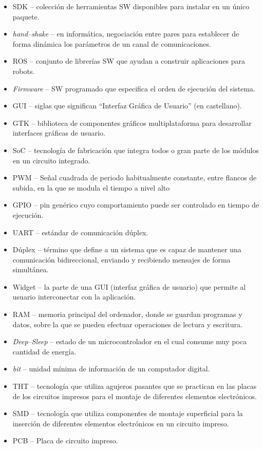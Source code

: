\begin{itemize}
    \item \ac{SDK} -- colección de herramientas \ac{SW} disponibles para instalar en un único paquete.
    \item \textit{hand--shake} -- en informática, negociación entre pares para establecer de forma dinámica los parámetros de un canal de comunicaciones. 
    \item \ac{ROS} -- conjunto de librerías \ac{SW} que ayudan a construir aplicaciones para robots.
    \item \textit{Firmware} -- \ac{SW} programado que especifica el orden de ejecución del sistema.
    \item \ac{GUI} -- siglas que significan ``Interfaz Gráfica de Usuario'' (en castellano).
    \item \ac{GTK} -- biblioteca de componentes gráficos multiplataforma para desarrollar interfaces gráficas de usuario.
    \item \ac{SoC} -- tecnología de fabricación que integra todos o gran parte de los módulos en un circuito integrado. 
    \item \ac{PWM} -- Señal cuadrada de periodo habitualmente constante, entre flancos de subida, en la que se modula el tiempo a nivel alto
    \item \ac{GPIO} -- pin genérico cuyo comportamiento puede ser controlado en tiempo de ejecución.
    \item \ac{UART} -- estándar de comunicación dúplex.
    \item Dúplex -- término que define a un sistema que es capaz de mantener una comunicación bidireccional, enviando y recibiendo mensajes de forma simultánea.
    \item Widget -- la parte de una GUI (interfaz gráfica de usuario) que permite al usuario interconectar con la aplicación.
    \item \ac{RAM} -- memoria principal del ordenador, donde se guardan programas y datos, sobre la que se pueden efectuar operaciones de lectura y escritura.
    \item \textit{Deep--Sleep} -- estado de un microcontrolador en el cual consume muy poca cantidad de energía.
    \item \textit{bit} -- unidad mínima de información de un computador digital.
    \item \ac{THT} -- tecnología que utiliza agujeros pasantes que se practican en las placas de los circuitos impresos para el montaje de diferentes elementos electrónicos.
    \item \ac{SMD} -- tecnología que utiliza componentes de montaje superficial para la inserción de diferentes elementos electrónicos en un circuito impreso.
    \item \ac{PCB} -- Placa de circuito impreso.
\end{itemize}
